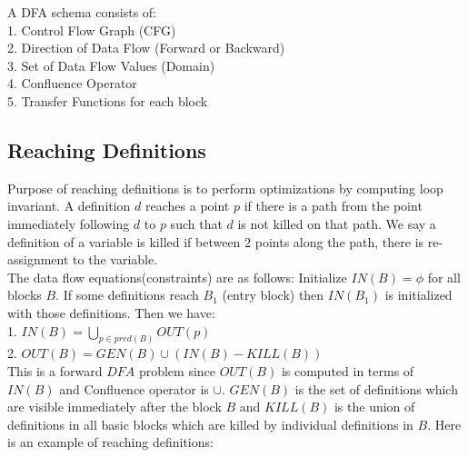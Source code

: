 \documentclass{article}
\begin{document}
A DFA schema consists of: \\    
1. Control Flow Graph (CFG) \\
2. Direction of Data Flow (Forward or Backward) \\
3. Set of Data Flow Values (Domain) \\
4. Confluence Operator \\
5. Transfer Functions for each block \\

\subsection*{Reaching Definitions} 
Purpose of reaching definitions is to perform optimizations by computing loop invariant. A definition $d$ reaches a point $p$ if there is a path from the point immediately following $d$ to $p$ such that $d$ is not killed on that path. We say a definition of a variable is killed if between 2 points along the path, there is re-assignment to the variable. \\

The data flow equations(constraints) are as follows: Initialize $IN(B) = \phi$ for all blocks $B$. If some definitions reach $B_1$ (entry block) then $IN(B_1)$ is initialized with those definitions. Then we have: \\
1. $IN(B) = \bigcup_{p \in pred(B)} OUT(p)$ \\
2. $OUT(B) = GEN(B) \cup (IN(B) - KILL(B))$ \\

This is a forward $DFA$ problem since $OUT(B)$ is computed in terms of $IN(B)$ and Confluence operator is $\cup$. $GEN(B)$ is the set of definitions which are visible immediately after the block $B$ and $KILL(B)$ is the union of  definitions in all basic blocks which are killed by individual definitions in $B$. Here is an example of reaching definitions:
\end{document}
